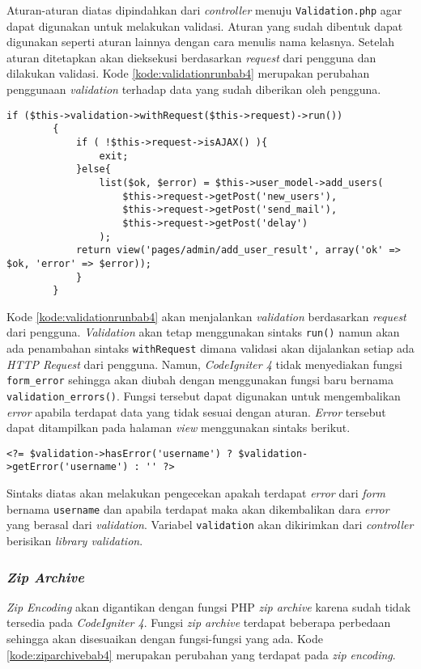 Aturan-aturan diatas dipindahkan dari \textit{controller} menuju \texttt{Validation.php} agar dapat digunakan untuk melakukan validasi. Aturan yang sudah dibentuk dapat digunakan seperti aturan lainnya dengan cara menulis nama kelasnya. Setelah aturan ditetapkan akan dieksekusi berdasarkan \textit{request} dari pengguna dan dilakukan validasi. Kode \ref{kode:validationrunbab4} merupakan perubahan penggunaan \textit{validation} terhadap data yang sudah diberikan oleh pengguna.
\begin{lstlisting}[caption=Perancangan perubahan penggunaan \textit{validation} pada \textit{CodeIgniter 4}, label=kode:validationrunbab4]
if ($this->validation->withRequest($this->request)->run())
		{
			if ( !$this->request->isAJAX() ){
				exit;
			}else{
				list($ok, $error) = $this->user_model->add_users(
					$this->request->getPost('new_users'),
					$this->request->getPost('send_mail'),
					$this->request->getPost('delay')
				);
			return view('pages/admin/add_user_result', array('ok' => $ok, 'error' => $error));
			}
		}
\end{lstlisting}

Kode \ref{kode:validationrunbab4} akan menjalankan \textit{validation} berdasarkan \textit{request} dari pengguna. \textit{Validation} akan tetap menggunakan sintaks \texttt{run()} namun akan ada penambahan sintaks \texttt{withRequest} dimana validasi akan dijalankan setiap ada \textit{HTTP Request} dari pengguna. Namun, \textit{CodeIgniter 4} tidak menyediakan fungsi \texttt{form\_error} sehingga akan diubah dengan menggunakan fungsi baru bernama \texttt{validation\_errors()}. Fungsi tersebut dapat digunakan untuk mengembalikan \textit{error} apabila terdapat data yang tidak sesuai dengan aturan. \textit{Error} tersebut dapat ditampilkan pada halaman \textit{view} menggunakan sintaks berikut.

\begin{center}
\verb|<?= $validation->hasError('username') ? $validation->getError('username') : '' ?>|
\end{center}

Sintaks diatas akan melakukan pengecekan apakah terdapat \textit{error} dari \textit{form} bernama \texttt{username} dan apabila terdapat maka akan dikembalikan dara \textit{error} yang berasal dari \textit{validation}. Variabel \texttt{validation} akan dikirimkan dari \textit{controller} berisikan \textit{library validation}.

\subsubsection{\textit{Zip Archive}}
\textit{Zip Encoding} akan digantikan dengan fungsi PHP \textit{zip archive} karena sudah tidak tersedia pada \textit{CodeIgniter 4}. Fungsi \textit{zip archive} terdapat beberapa perbedaan sehingga akan disesuaikan dengan fungsi-fungsi yang ada. Kode \ref{kode:ziparchivebab4} merupakan perubahan yang terdapat pada \textit{zip encoding}.

